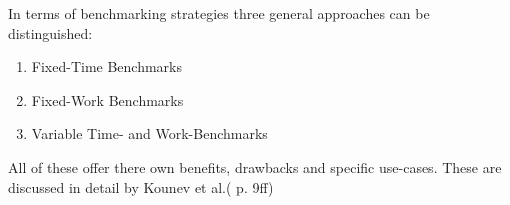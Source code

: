 \documentclass[	runningheads,
				a4paper]{llncs}
\begin{document}



In terms of benchmarking strategies three general approaches can be distinguished:
\begin{enumerate}
	\item Fixed-Time Benchmarks
	\item Fixed-Work Benchmarks
	\item Variable Time- and Work-Benchmarks
\end{enumerate}

All of these offer there own benefits, drawbacks and specific use-cases. These are discussed in detail by Kounev et al.(\cite{Kounev} p. 9ff)



\end{document}
